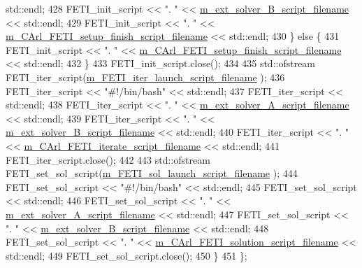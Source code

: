 \begin{DoxyCode}
      std::endl;
428             FETI\_init\_script << \textcolor{stringliteral}{". "} << \hyperlink{classcarl_1_1_solver___files___setup_a333e20119d68b1d0dda2494823ae08d4}{m\_ext\_solver\_B\_script\_filename} << 
      std::endl;
429             FETI\_init\_script << \textcolor{stringliteral}{". "} << \hyperlink{classcarl_1_1_solver___files___setup_a74f8cd1404471542269a1cc9aa8c8d84}{m\_CArl\_FETI\_setup\_finish\_script\_filename}
       << std::endl;
430         \} \textcolor{keywordflow}{else} \{
431             FETI\_init\_script << \textcolor{stringliteral}{". "} << \hyperlink{classcarl_1_1_solver___files___setup_a74f8cd1404471542269a1cc9aa8c8d84}{m\_CArl\_FETI\_setup\_finish\_script\_filename}
       << std::endl;
432         \}
433         FETI\_init\_script.close();
434 
435         std::ofstream FETI\_iter\_script(\hyperlink{classcarl_1_1_solver___files___setup_a9f37bf7f6f91b9dcb29641268206a1a0}{m\_FETI\_iter\_launch\_script\_filename}
      );
436         FETI\_iter\_script << \textcolor{stringliteral}{"#!/bin/bash"} << std::endl;
437         FETI\_iter\_script << std::endl;
438         FETI\_iter\_script << \textcolor{stringliteral}{". "} << \hyperlink{classcarl_1_1_solver___files___setup_a181a314159810779c3c443082ae93563}{m\_ext\_solver\_A\_script\_filename} << 
      std::endl;
439         FETI\_iter\_script << \textcolor{stringliteral}{". "} << \hyperlink{classcarl_1_1_solver___files___setup_a333e20119d68b1d0dda2494823ae08d4}{m\_ext\_solver\_B\_script\_filename} << 
      std::endl;
440         FETI\_iter\_script << \textcolor{stringliteral}{". "} << \hyperlink{classcarl_1_1_solver___files___setup_a9ce875697a888d84dbd186f74e64cd6a}{m\_CArl\_FETI\_iterate\_script\_filename} 
      << std::endl;
441         FETI\_iter\_script.close();
442 
443         std::ofstream FETI\_set\_sol\_script(\hyperlink{classcarl_1_1_solver___files___setup_a79c7bb3275ef8c1aee1e6dc857c0b0ea}{m\_FETI\_sol\_launch\_script\_filename}
      );
444         FETI\_set\_sol\_script << \textcolor{stringliteral}{"#!/bin/bash"} << std::endl;
445         FETI\_set\_sol\_script << std::endl;
446         FETI\_set\_sol\_script << \textcolor{stringliteral}{". "} << \hyperlink{classcarl_1_1_solver___files___setup_a181a314159810779c3c443082ae93563}{m\_ext\_solver\_A\_script\_filename} << 
      std::endl;
447         FETI\_set\_sol\_script << \textcolor{stringliteral}{". "} << \hyperlink{classcarl_1_1_solver___files___setup_a333e20119d68b1d0dda2494823ae08d4}{m\_ext\_solver\_B\_script\_filename} << 
      std::endl;
448         FETI\_set\_sol\_script << \textcolor{stringliteral}{". "} << \hyperlink{classcarl_1_1_solver___files___setup_a147113a3a6de5fa59e4236adf08e16b2}{m\_CArl\_FETI\_solution\_script\_filename}
       << std::endl;
449         FETI\_set\_sol\_script.close();
450     \}
451 \};
\end{DoxyCode}
